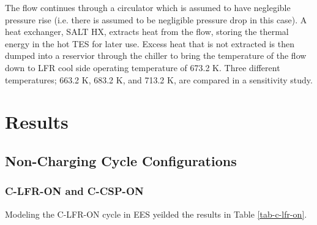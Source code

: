 \begin{paracol}{2}
\linenumbers
\switchcolumn

The flow continues through a circulator which is assumed to have neglegible pressure rise (i.e. there is assumed to be negligible pressure drop in this case). A heat exchanger, SALT HX, extracts heat from the flow, storing the thermal energy in the hot TES for later use. Excess heat that is not extracted is then dumped into a reservior through the chiller to bring the temperature of the flow down to LFR cool side operating temperature of 673.2 K. Three different temperatures; 663.2 K, 683.2 K, and 713.2 K, are compared in a sensitivity study. 



\section{Results}

\subsection{Non-Charging Cycle Configurations}

\subsubsection{C-LFR-ON and C-CSP-ON}

Modeling the C-LFR-ON cycle in EES yeilded the results in Table \ref{tab-c-lfr-on}. 


\end{paracol}
